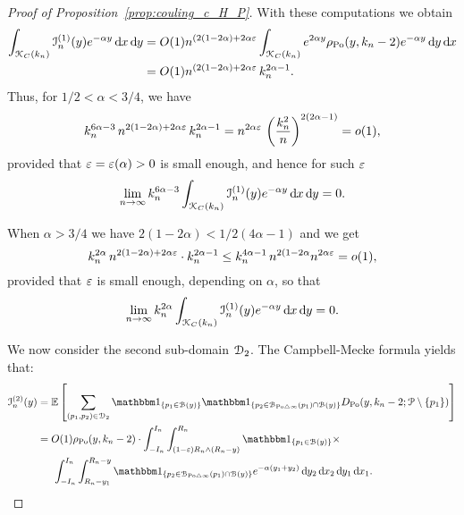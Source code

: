 \begin{proof}[Proof of Proposition~\ref{prop:couling_c_H_P}]
With these computations we obtain
\begin{align*} 
	\int_{{\mathcal K}_{C}(k_n)} \mathcal{I}_n^{(1)}(y) e^{-\alpha y} \operatorname{\mathrm{d}\hspace{-2pt}} x \operatorname{\mathrm{d}\hspace{-2pt}} y
	&= O(1) n^{(2(1-2\alpha) + 2\alpha \varepsilon}
		\int_{{\mathcal K}_{C}(k_n)} e^{2\alpha y} \rho_{{\mathrm{Po}}}(y,k_n-2) e^{-\alpha y} \operatorname{\mathrm{d}\hspace{-2pt}} y \operatorname{\mathrm{d}\hspace{-2pt}} x \\ 
	&=O(1) n^{(2(1-2\alpha) + 2\alpha \varepsilon} \, k_n^{2\alpha - 1}.
\end{align*}
Thus, for $1/2 < \alpha < 3/4$, we have 
\begin{equation*}
k_n^{6 \alpha -3} \,  n^{2(1-2\alpha) + 2\alpha \varepsilon} \, k_n^{2\alpha -1} = 
n^{2\alpha \varepsilon} \, \left( \frac{k_n^2}{n} \right)^{2(2\alpha -1)} = o(1), 
\end{equation*}
provided that $\varepsilon = \varepsilon (\alpha)>0$ is small enough, and hence for such $\varepsilon$
\[
	\lim_{n \to \infty} k_n^{6\alpha - 3} \int_{{\mathcal K}_{C}(k_n)} \mathcal{I}_n^{(1)}(y) e^{-\alpha y} \operatorname{\mathrm{d}\hspace{-2pt}} x \operatorname{\mathrm{d}\hspace{-2pt}} y = 0.
\]

When $\alpha > 3/4$ we have $2(1-2\alpha) < 1/2(4\alpha - 1)$ and we get
\begin{equation*} 
k_n^{2\alpha} \, n^{2(1-2\alpha) + 2\alpha \varepsilon} \cdot k_n^{2\alpha -1}
\le  k_n^{4\alpha - 1} \, n^{2(1-2\alpha} n^{2\alpha \varepsilon} = o(1),
\end{equation*}
provided that $\varepsilon$ is small enough, depending on $\alpha$, so that
\[
	\lim_{n \to \infty} k_n^{2\alpha} \int_{{\mathcal K}_{C}(k_n)} \mathcal{I}_n^{(1)}(y) e^{-\alpha y} \operatorname{\mathrm{d}\hspace{-2pt}} x \operatorname{\mathrm{d}\hspace{-2pt}} y = 0.
\]


We now consider the second sub-domain $\mathcal{D}_{2}$. The Campbell-Mecke formula yields that: 
\begin{align*}
	\mathcal{I}_n^{(2)}(y) 
	&= \Exp { \sum_{(p_1,p_2)  \in \dom{2}} \ind{p_1 \in \BallHyp{y}} \ind{p_2 \in \BallSym{p_1} \cap \BallHyp{y}}
		D_{\Po} (y,k_n-2;\Pcal \setminus \{ p_1\})} \\
	&= O(1) \rho_{\Po}(y,k_n-2) \cdot \int_{-I_n}^{I_n} \int_{(1-\eps) R_n \wedge (R_n-y)}^{R_n} 
		\ind{p_1 \in \BallHyp{y}} \times \\
	&\hspace{15pt} \int_{-I_n}^{I_n} \int_{R_n - y_1}^{R_n-y} \ind{p_2 \in \BallSym{p_1} \cap \BallHyp{y}}
		e^{-\alpha(y_1 + y_2)} \dd y_2 \dd x_2 \dd y_1 \dd x_1.
\end{align*}


\end{proof}
